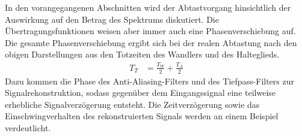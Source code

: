 In den vorangegangenen Abschnitten wird der Abtastvorgang hinsichtlich der Auswirkung auf den Betrag des Spektrums diskutiert. Die Übertragungsfunktionen weisen aber immer auch eine Phasenverschiebung auf. Die gesamte Phasenverschiebung ergibt sich bei der realen Abtastung nach den obigen Darstellungen aus den Totzeiten des Wandlers und des Halteglieds.
\begin{align}
T_{T} &= \frac{T_{W}}{2} + \frac{T_{A}}{2} \label{eq:2.31}
\end{align}
Dazu kommen die Phase des Anti-Aliasing-Filters und des Tiefpass-Filters zur Signalrekonstruktion, sodass gegenüber dem Eingangssignal eine teilweise erhebliche Signalverzögerung entsteht. Die Zeitverzögerung sowie das Einschwingverhalten des rekonstruierten Signals werden an einem Beispiel verdeutlicht.

